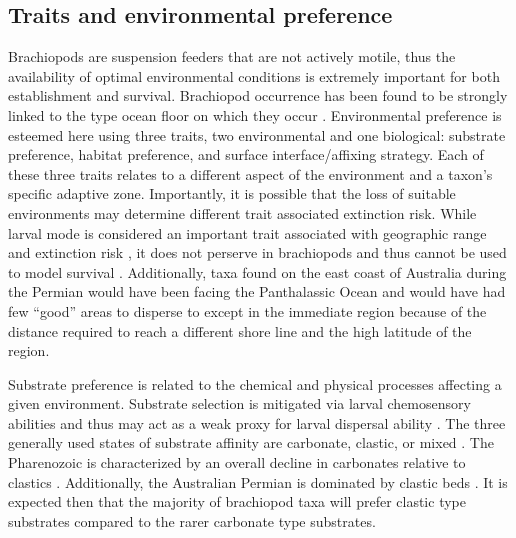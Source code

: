 \documentclass[12pt,letterpaper]{article}
\begin{document}
\subsection{Traits and environmental preference} \label{sec:bracback}
Brachiopods are suspension feeders that are not actively motile, thus the availability of optimal environmental conditions is extremely important for both establishment and survival. Brachiopod occurrence has been found to be strongly linked to the type ocean floor on which they occur \citep{Richardson1997,Richardson1997a}. Environmental preference is esteemed here using three traits, two environmental and one biological: substrate preference, habitat preference, and surface interface/affixing strategy. Each of these three traits relates to a different aspect of the environment and a taxon's specific adaptive zone. Importantly, it is possible that the loss of suitable environments may determine different trait associated extinction risk. While larval mode is considered an important trait associated with geographic range and extinction risk \citep{Jablonski2006a,Jablonski1983}, it does not perserve in brachiopods and thus cannot be used to model survival \citep{Jablonski1983}. Additionally, taxa found on the east coast of Australia during the Permian would have been facing the Panthalassic Ocean and would have had few ``good'' areas to disperse to except in the immediate region because of the distance required to reach a different shore line and the high latitude of the region.

Substrate preference is related to the chemical and physical processes affecting a given environment. Substrate selection is mitigated via larval chemosensory abilities and thus may act as a weak proxy for larval dispersal ability \citep{Jablonski2006a,Jablonski1983}. The three generally used states of substrate affinity are carbonate, clastic, or mixed \citep{Foote2006,Anderson2011a,Nurnberg2013a,Kiessling2007a,Miller2001}. The Pharenozoic is characterized by an overall decline in carbonates relative to clastics \citep{Foote2006,Miller2001}. Additionally, the Australian Permian is dominated by clastic beds \citep{Birgenheier2010,Percival2012,Thomas2007,Fielding2008a,Fielding2008}. It is expected then that the majority of brachiopod taxa will prefer clastic type substrates compared to the rarer carbonate type substrates.
\end{document}
